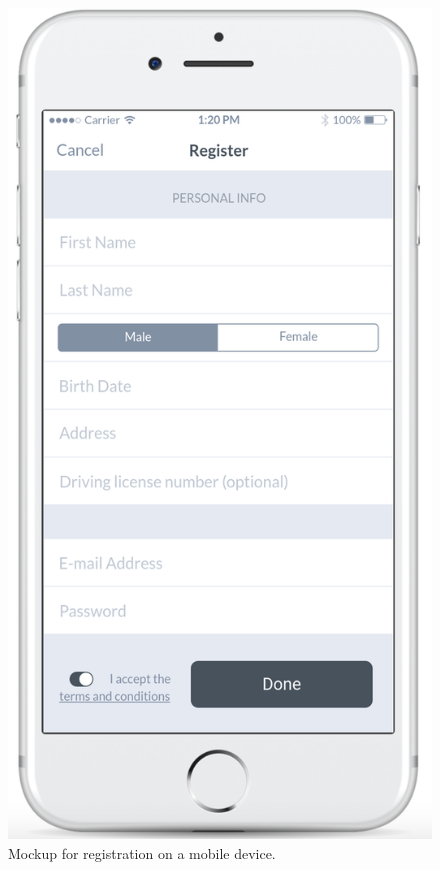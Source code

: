 \documentclass{article}
\begin{document}
	\begin{figure}[h!]
		\bigskip
		\centering
		\includegraphics[scale=0.25]{img/mockups/mobile/register.png}
		\caption{Mockup for registration on a mobile device.}
	\end{figure}
\end{document}
